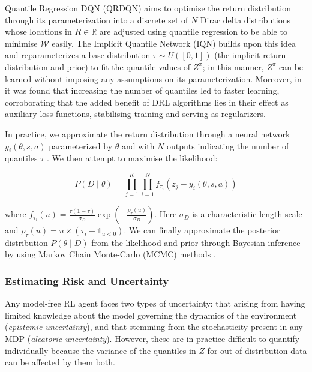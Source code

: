 \documentclass[12pt,twoside]{report}
\begin{document}
\smallskip

Quantile Regression DQN (QRDQN) \cite{quantile-regression} aims to optimise the return distribution through its parameterization into a discrete set of $N$ Dirac delta distributions whose locations in $R \in \mathbb{R}$ are adjusted using quantile regression to be able to minimise $\mathcal{W}$ easily. The Implicit Quantile Network (IQN) \cite{quantile-networks} builds upon this idea and reparameterizes a base distribution $\tau \sim U(\left[0,1\right])$ (the implicit return distribution and prior) to fit the quantile values of $Z^\pi$; in this manner, $Z^\pi$ can be learned without imposing any assumptions on its parameterization. Moreover, in \cite{quantile-networks} it was found that increasing the number of quantiles led to faster learning, corroborating that the added benefit of DRL algorithms lies in their effect as auxiliary loss functions, stabilising training and serving as regularizers. 

\smallskip

In practice, we approximate the return distribution through a neural network $y_i(\theta,s,a)$ parameterized by $\theta$ and with $N$ outputs indicating the number of quantiles $\tau$ \cite{risk-uncertainty}. We then attempt to maximise the likelihood: 

\begin{equation}
    P(D \! \mid \! \theta) = \prod_{j=1}^{K}\prod_{i=1}^{N} f_{\tau_i}(z_j - y_i(\theta,s,a))
\end{equation}

\noindent where $f_{\tau_i}(u) = \frac{\tau(1-\tau)}{\sigma_D}\exp(-\frac{\rho_\tau(u)}{\sigma_D})$. Here $\sigma_D$ is a characteristic length scale and $\rho_\tau (u) = u \times (\tau_i - \mathds{1}_{u < 0})$. We can finally approximate the posterior distribution $P(\theta \! \mid \! D)$ from the likelihood and prior through Bayesian inference by using Markov Chain Monte-Carlo (MCMC) methods \cite{MCMC}. 

\subsubsection{Estimating Risk and Uncertainty}

Any model-free RL agent faces two types of uncertainty: that arising from having limited knowledge about the model governing the dynamics of the environment (\textit{epistemic uncertainty}), and that stemming from the stochasticity present in any MDP (\textit{aleatoric uncertainty}). However, these are in practice difficult to quantify individually because the variance of the quantiles in $Z$ for out of distribution data can be affected by them both.
\end{document}
